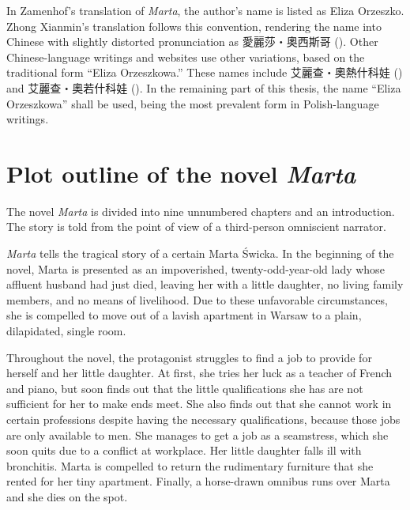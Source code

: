 In Zamenhof's translation of \textit{Marta}, the author's name is listed as Eliza Orzeszko.
Zhong Xianmin's translation follows this convention, rendering the name into Chinese with slightly distorted pronunciation as 愛麗莎・奧西斯哥 ().
Other Chinese-language writings and websites use other variations, based on the traditional form ``Eliza Orzeszkowa.''
These names include 艾麗查・奧熱什科娃 () and 艾麗查・奧若什科娃 (). In the remaining part of this thesis, the name ``Eliza Orzeszkowa'' shall be used, being the most prevalent form in Polish-language writings.

\section{Plot outline of the novel \textit{Marta}}
The novel \textit{Marta} is divided into nine unnumbered chapters and an introduction. 
The story is told from the point of view of a third-person omniscient narrator.

\textit{Marta} tells the tragical story of a certain Marta Świcka.
In the beginning of the novel, Marta is presented as an impoverished, twenty-odd-year-old lady whose affluent husband had just died, leaving her with a little daughter, no living family members, and no means of livelihood.
Due to these unfavorable circumstances, she is compelled to move out of a lavish apartment in Warsaw to a plain, dilapidated, single room.

Throughout the novel, the protagonist struggles to find a job to provide for herself and her little daughter.
At first, she tries her luck as a teacher of French and piano, but soon finds out that the little qualifications she has are not sufficient for her to make ends meet.
She also finds out that she cannot work in certain professions despite having the necessary qualifications, because those jobs are only available to men.
She manages to get a job as a seamstress, which she soon quits due to a conflict at workplace.
Her little daughter falls ill with bronchitis.
Marta is compelled to return the rudimentary furniture that she rented for her tiny apartment.
Finally, a horse-drawn omnibus runs over Marta and she dies on the spot.